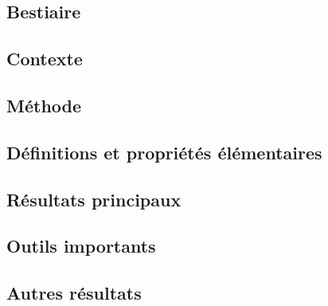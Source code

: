 \documentclass[11pt,a4paper]{article}
\begin{document}
\newpage
\begin{center}  
\section*{Bestiaire} 
\end{center}



\subsection*{Contexte}

\subsection*{Méthode}

\subsection*{Définitions et propriétés élémentaires}

\subsection*{Résultats principaux}

\subsection*{Outils importants}


\subsection*{Autres résultats}
\end{document}
